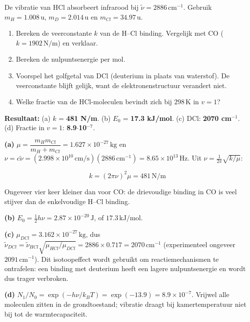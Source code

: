 \begin{oefening}
De vibratie van HCl absorbeert infrarood bij \(\tilde\nu = 2886\,\mathrm{cm^{-1}}\). Gebruik \(m_H = 1.008\,\mathrm{u}\), \(m_D = 2.014\,\mathrm{u}\) en \(m_{Cl} = 34.97\,\mathrm{u}\).

\begin{enumerate}
\item[(a)]
  Bereken de veerconstante \(k\) van de H--Cl binding. Vergelijk met CO (\(k = 1902\,\mathrm{N/m}\)) en verklaar.
\item[(b)]
  Bereken de nulpuntsenergie per mol.
\item[(c)]
  Voorspel het golfgetal van DCl (deuterium in plaats van waterstof). De veerconstante blijft gelijk, want de elektronenstructuur verandert niet.
\item[(d)]
  Welke fractie van de HCl-moleculen bevindt zich bij \(298\,\mathrm{K}\) in \(v = 1\)?
\end{enumerate}
\end{oefening}
\begin{oplossing}
\textbf{Resultaat:} (a) \(k\) = \textbf{481 N/m}. (b) \(E_0\) = \textbf{17.3 kJ/mol}. (c) DCl: \textbf{2070 cm\ensuremath{^{-1}}}. (d) Fractie in \(v = 1\): \textbf{8.9\ensuremath{\cdot{}}10\ensuremath{^{-7}}}.

\textbf{(a)} \(\mu = \dfrac{m_H m_{Cl}}{m_H + m_{Cl}} = 1.627\times10^{-27}\,\mathrm{kg}\) en \(\nu = c\tilde\nu = (2.998\times10^{10}\,\mathrm{cm/s})(2886\,\mathrm{cm^{-1}}) = 8.65\times10^{13}\,\mathrm{Hz}\). Uit \(\nu = \frac{1}{2\pi}\sqrt{k/\mu}\):

\[
k = (2\pi\nu)^2\mu = 481\,\mathrm{N/m}
\]

Ongeveer vier keer kleiner dan voor CO: de drievoudige binding in CO is veel stijver dan de enkelvoudige H--Cl binding.

\textbf{(b)} \(E_0 = \frac{1}{2}h\nu = 2.87\times10^{-20}\,\mathrm{J}\), of \(17.3\,\mathrm{kJ/mol}\).

\textbf{(c)} \(\mu_{DCl} = 3.162\times10^{-27}\,\mathrm{kg}\), dus \(\tilde\nu_{DCl} = \tilde\nu_{HCl}\sqrt{\mu_{HCl}/\mu_{DCl}} = 2886 \times 0.717 = 2070\,\mathrm{cm^{-1}}\) (experimenteel ongeveer \(2091\,\mathrm{cm^{-1}}\)). Dit isotoopeffect wordt gebruikt om reactiemechanismen te ontrafelen: een binding met deuterium heeft een lagere nulpuntsenergie en wordt dus trager verbroken.

\textbf{(d)} \(N_1/N_0 = \exp(-h\nu/k_BT) = \exp(-13.9) = 8.9\times10^{-7}\). Vrijwel alle moleculen zitten in de grondtoestand; vibratie draagt bij kamertemperatuur niet bij tot de warmtecapaciteit.
\end{oplossing}


